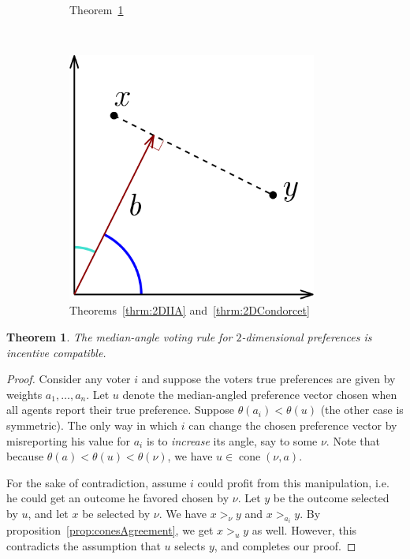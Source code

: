 \documentclass[12pt]{article}
\newtheorem{theorem}{Theorem}
\DeclareMathOperator*{\cone}{cone}
\newcommand{\1}[1]{\mathds{1}[{#1}]}
\begin{document}
\begin{figure}[h]
\begin{subfigure}[t]{0.3\textwidth}
      \caption{Theorem~\ref{thrm:2DincentiveCompat}}
      \label{fig:tiger}
    \end{subfigure}
    ~
    \begin{subfigure}[t]{0.3\textwidth}
      \includegraphics[width=0.9\textwidth]{figures/thrmIIA}
      \caption{Theorems~\ref{thrm:2DIIA} and~\ref{thrm:2DCondorcet}}
      \label{fig:domHull}
    \end{subfigure}

    \caption{}\label{fig:animals}
  \end{figure}

  \begin{theorem}\label{thrm:2DincentiveCompat}
    The median-angle voting rule for $2$-dimensional preferences
    is incentive compatible.
  \end{theorem}
  \begin{proof}
    Consider any voter $i$ and suppose the voters true preferences 
    are given by weights $a_1,\ldots,a_n$.
    Let $u$ denote the median-angled preference vector chosen when all
    agents report their true preference.
    Suppose $\theta(a_i) < \theta(u)$ (the other case is symmetric).
    The only way in which $i$ can change the chosen preference vector
    by misreporting his value for $a_i$
    is to \emph{increase} its angle, say to some $\nu$.
    Note that because $\theta(a) < \theta(u) < \theta(\nu)$,
    we have $u \in \cone(\nu,a)$.

    For the sake of contradiction, assume $i$ could profit from this
    manipulation, i.e. he could get an outcome he favored chosen by $\nu$.
    Let $y$ be the outcome selected by $u$, and let $x$ be selected by $\nu$.
    We have $x >_\nu y$ and $x >_{a_i} y$.
    By proposition~\ref{prop:conesAgreement}, we get $x >_u y$ as well.
    However, this contradicts the assumption that $u$ selects $y$,
    and completes our proof.
  \end{proof}
\end{document}
